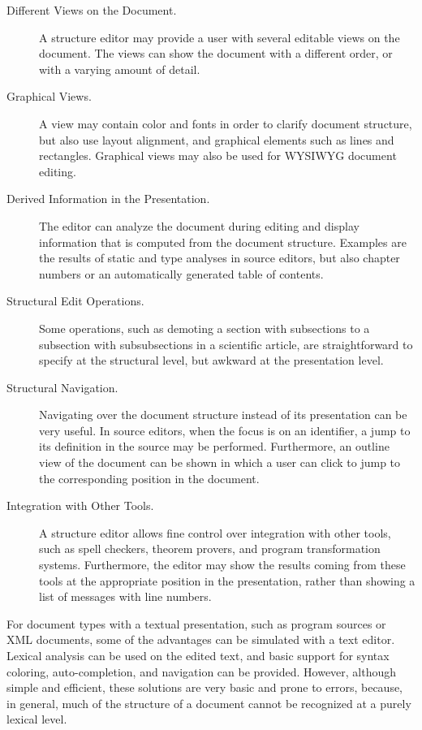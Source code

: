 \begin{description}
\item[Different Views on the Document.] A structure editor may provide a user with several editable views on the document. The views can show the document with a different order, or with a varying amount of detail. 

\item[Graphical Views.] A view may contain color and fonts in order to clarify document structure, but also use layout alignment, and graphical elements such as lines and rectangles. Graphical views may also be used for WYSIWYG document editing.

\item[Derived Information in the Presentation.] The editor can analyze the document during editing and display information that is computed from the document structure. Examples are the results of static and type analyses in source editors, but also chapter numbers or an automatically generated table of contents.

\item[Structural Edit Operations.] Some operations, such as demoting a section with subsections to a subsection with subsubsections in a scientific article, are straightforward to specify at the structural level, but awkward at the presentation level.

\item[Structural Navigation.] Navigating over the document structure instead of its presentation can be very useful. In source editors, when the focus is on an identifier, a jump to its definition in the source may be performed. Furthermore, an outline view of the document can be shown in which a user can click to jump to the corresponding position in the document.

\item[Integration with Other Tools.] A structure editor allows fine control over integration with other tools, such as spell checkers, theorem provers, and program transformation systems. Furthermore, the editor may show the results coming from these tools at the appropriate position in the presentation, rather than showing a list of messages with line numbers. 

\end{description}

For document types with a textual presentation, such as program sources or XML documents, some of the advantages can be simulated with a text editor. Lexical analysis can be used on the edited text, and basic support for syntax coloring, auto-completion, and navigation can be provided. However, although simple and efficient, these solutions are  very basic and prone to errors, because, in general, much of the structure of a document cannot be recognized at a purely lexical level.

